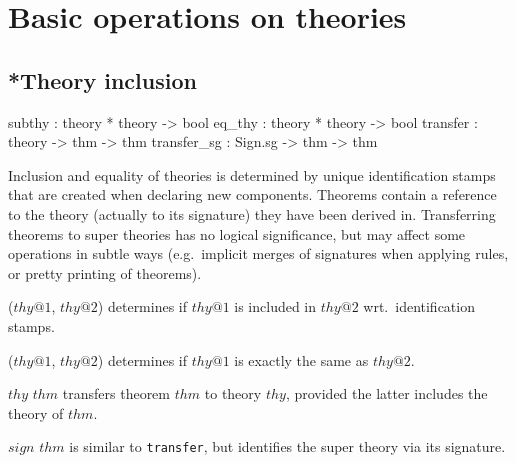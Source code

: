 \section{Basic operations on theories}\label{BasicOperationsOnTheories}

\subsection{*Theory inclusion}
\begin{ttbox}
subthy      : theory * theory -> bool
eq_thy      : theory * theory -> bool
transfer    : theory -> thm -> thm
transfer_sg : Sign.sg -> thm -> thm
\end{ttbox}

Inclusion and equality of theories is determined by unique
identification stamps that are created when declaring new components.
Theorems contain a reference to the theory (actually to its signature)
they have been derived in.  Transferring theorems to super theories
has no logical significance, but may affect some operations in subtle
ways (e.g.\ implicit merges of signatures when applying rules, or
pretty printing of theorems).

\begin{ttdescription}

\item[\ttindexbold{subthy} ($thy@1$, $thy@2$)] determines if $thy@1$
  is included in $thy@2$ wrt.\ identification stamps.

\item[\ttindexbold{eq_thy} ($thy@1$, $thy@2$)] determines if $thy@1$
  is exactly the same as $thy@2$.

\item[\ttindexbold{transfer} $thy$ $thm$] transfers theorem $thm$ to
  theory $thy$, provided the latter includes the theory of $thm$.
  
\item[\ttindexbold{transfer_sg} $sign$ $thm$] is similar to
  \texttt{transfer}, but identifies the super theory via its
  signature.

\end{ttdescription}


